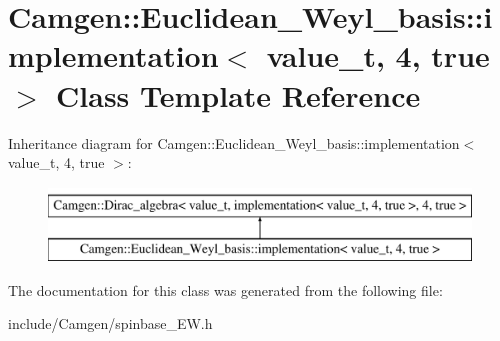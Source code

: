 \hypertarget{a00304}{}\section{Camgen\+:\+:Euclidean\+\_\+\+Weyl\+\_\+basis\+:\+:implementation$<$ value\+\_\+t, 4, true $>$ Class Template Reference}
\label{a00304}
Inheritance diagram for Camgen\+:\+:Euclidean\+\_\+\+Weyl\+\_\+basis\+:\+:implementation$<$ value\+\_\+t, 4, true $>$\+:\begin{figure}[H]
\begin{center}
\leavevmode
\includegraphics[height=2.000000cm]{a00304}
\end{center}
\end{figure}


The documentation for this class was generated from the following file\+:\begin{DoxyCompactItemize}
\item 
include/\+Camgen/spinbase\+\_\+\+E\+W.\+h\end{DoxyCompactItemize}
